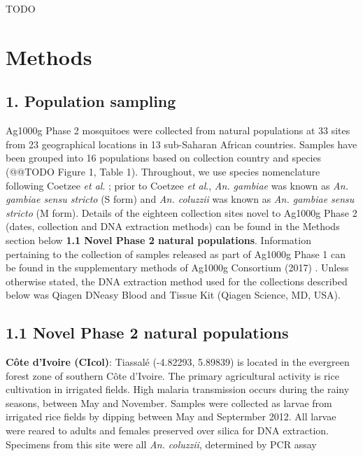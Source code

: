 \documentclass[a4paper,11pt,abstracton,hidelinks]{scrartcl}
\begin{document}
TODO


\section*{Methods}


\subsection*{1. Population sampling}

%
Ag1000g Phase 2 mosquitoes were collected from natural populations at 33 sites from 23
geographical locations in 13 sub-Saharan African countries. 
%
Samples have been grouped into 16 populations based on collection country and species (@@TODO Figure 1, Table 1).
%
Throughout, we use species nomenclature following Coetzee \textit{et al}. \cite{Coetzee2013};	
%
prior to	 Coetzee	 \textit{et al}., \textit{An. gambiae} was known as \textit{An. gambiae sensu stricto} (S form) and \textit{An. coluzzii} was known as \textit{An. gambiae sensu stricto} (M form).
%
Details of the eighteen collection sites novel to Ag1000g Phase 2 (dates, collection and DNA extraction methods) can be found in the Methods section below \textbf{1.1 Novel Phase 2 natural populations}.
%
Information pertaining to the collection of samples released as part of Ag1000g Phase 1 can be found in the supplementary methods of Ag1000g Consortium (2017) \cite{Ag1000gConsortium2017}.
%
Unless otherwise stated, the DNA extraction method used for the collections described below was Qiagen DNeasy Blood and Tissue Kit (Qiagen Science, MD, USA).

\subsection*{1.1 Novel Phase 2 natural populations}
%
\textbf{C\^{o}te d'Ivoire (CIcol)}: Tiassal\'{e} (-4.82293, 5.89839) is located in the evergreen forest zone of southern C\^{o}te d'Ivoire.
%
The primary agricultural activity is rice cultivation in irrigated fields.
%
High malaria transmission occurs during the rainy seasons, between May and November.
%
Samples were collected as larvae from irrigated rice fields by dipping between May and Septermber 2012.
%
All larvae were reared to adults and females preserved over silica for DNA extraction.
%
Specimens from this site were all \textit{An. coluzzii}, determined by PCR assay \cite{Santolamazza2008}
\end{document}
